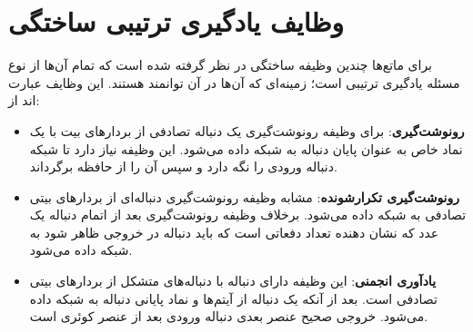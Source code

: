 \section{وظایف یادگیری ترتیبی ساختگی}
برای ماتع‌ها چندین وظیفه ساختگی در نظر گرفته شده است که تمام آن‌ها از نوع مسئله یادگیری ترتیبی است؛ زمینه‌ای که آن‌ها در آن توانمند هستند. این وظایف عبارت اند از:
\begin{itemize}
\item \textbf{رونوشت‌گیری}:
برای وظیفه رونوشت‌گیری یک دنباله تصادفی از بردارهای بیت با یک نماد خاص به عنوان پایان دنباله به شبکه داده می‌شود. این وظیفه نیاز دارد تا شبکه دنباله ورودی را نگه دارد و سپس آن را از حافظه برگرداند.

\item \textbf{رونوشت‌گیری تکرارشونده}:
مشابه وظیفه رونوشت‌گیری دنباله‌ای از بردارهای بیتی تصادفی به شبکه داده می‌شود. برخلاف وظیفه رونوشت‌گیری بعد از اتمام دنباله یک عدد که نشان دهنده تعداد دفعاتی است که باید دنباله در خروجی ظاهر شود به شبکه داده می‌شود.

\item \textbf{یادآوری انجمنی}:
این وظیفه دارای دنباله با دنباله‌های متشکل از بردارهای بیتی تصادفی است. بعد از آنکه یک دنباله از آیتم‌ها و نماد پایانی دنباله به شبکه داده می‌شود. خروجی صحیح عنصر بعدی دنباله ورودی بعد از عنصر کوئری است.\cite{collier2018implementing} 

\end{itemize}
